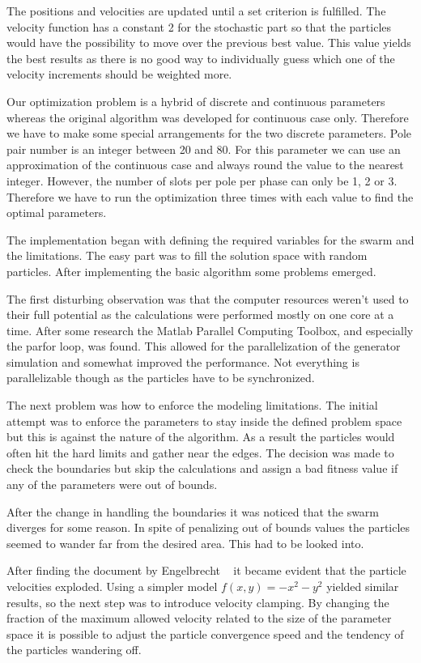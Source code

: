 \documentclass[twoside]{article}
\begin{document}
\begin{multicols}{2}
The positions and velocities are updated until a set criterion is fulfilled. The velocity function has a constant 2 for the stochastic part so that the particles would have the possibility to move over the previous best value. This value yields the best results as there is no good way to individually guess which one of the velocity increments should be weighted more. \cite{pso} 

Our optimization problem is a hybrid of discrete and continuous parameters whereas the original algorithm was developed for continuous case only. Therefore we have to make some special arrangements for the two discrete parameters. Pole pair number is an integer between 20 and 80. For this parameter we can use an approximation of the continuous case and always round the value to the nearest integer. However, the number of slots per pole per phase can only be 1, 2 or 3. Therefore we have to run the optimization three times with each value to find the optimal parameters.

The implementation began with defining the required variables for the swarm and the limitations. The easy part was to fill the solution space with random particles. After implementing the basic algorithm some problems emerged.

The first disturbing observation was that the computer resources weren't used to their full potential as the calculations were performed mostly on one core at a time. After some research the Matlab Parallel Computing Toolbox, and especially the parfor loop, was found. This allowed for the parallelization of the generator simulation and somewhat improved the performance. Not everything is parallelizable though as the particles have to be synchronized. 

The next problem was how to enforce the modeling limitations. The initial attempt was to enforce the parameters to stay inside the defined problem space but this is against the nature of the algorithm. As a result the particles would often hit the hard limits and gather near the edges. The decision was made to check the boundaries but skip the calculations and assign a bad fitness value if any of the parameters were out of bounds.

After the change in handling the boundaries it was noticed that the swarm diverges for some reason. In spite of penalizing out of bounds values the particles seemed to wander far from the desired area. This had to be looked into.

After finding the document by Engelbrecht ~\cite{pitfalls} it became evident that the particle velocities exploded. Using a simpler model $f(x,y)=-x^2-y^2$ yielded similar results, so the next step was to introduce velocity clamping. By changing the fraction of the maximum allowed velocity related to the size of the parameter space it is possible to adjust the particle convergence speed and the tendency of the particles wandering off.



\end{multicols}
\end{document}
